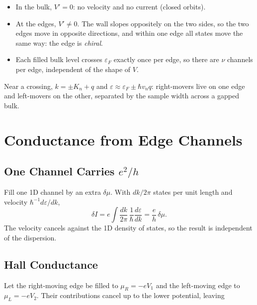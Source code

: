 \begin{fact}
\leavevmode
\begin{itemize}
    \item In the bulk, $V' = 0$: no velocity and no current (closed orbits).
    \item At the edges, $V'\neq0$. The wall slopes oppositely on the two sides, so the two edges move in opposite directions, and within one edge all states move the same way: the edge is \emph{chiral}.
    \item Each filled bulk level crosses $\varepsilon_F$ exactly once per edge, so there are $\nu$ channels per edge, independent of the shape of $V$.
\end{itemize}
\end{fact}

Near a crossing, $k = \pm K_n + q$ and $\varepsilon\approx\varepsilon_F\pm\hbar v_nq$: right-movers live on one edge and left-movers on the other, separated by the sample width across a gapped bulk.

\section{Conductance from Edge Channels}

\subsection{One Channel Carries \texorpdfstring{$e^2/h$}{e2/h}}

Fill one 1D channel by an extra $\delta\mu$. With $dk/2\pi$ states per unit length and velocity $\hbar^{-1}d\varepsilon/dk$,
\begin{equation}
    \delta I = e\int\frac{dk}{2\pi}\,\frac1\hbar\frac{d\varepsilon}{dk} = \frac{e}{h}\,\delta\mu.
\end{equation}
The velocity cancels against the 1D density of states, so the result is independent of the dispersion.

\subsection{Hall Conductance}

Let the right-moving edge be filled to $\mu_R = -eV_1$ and the left-moving edge to $\mu_L = -eV_2$. Their contributions cancel up to the lower potential, leaving

